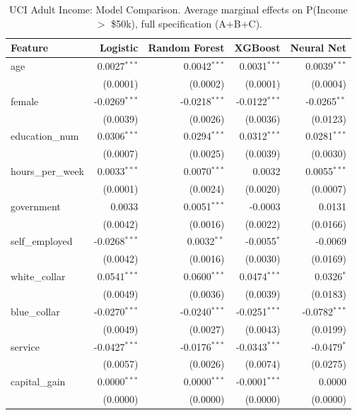 \documentclass[conference]{IEEEtran}
\begin{document}
	\begin{table}[htbp]
		\centering
		\small
		\begin{threeparttable}
			\caption{UCI Adult Income: Model Comparison. Average marginal effects on P(Income $>$ \$50k), full specification (A+B+C).}
			\label{tab:adult_model_comparison}
			\begin{tabular}{lrrrr}
				\toprule
				Feature & Logistic & Random Forest & XGBoost & Neural Net \\
				\midrule
				age & 0.0027$^{***}$ & 0.0042$^{***}$ & 0.0031$^{***}$ & 0.0039$^{***}$ \\
				& (0.0001) & (0.0002) & (0.0001) & (0.0004) \\
				female & -0.0269$^{***}$ & -0.0218$^{***}$ & -0.0122$^{***}$ & -0.0265$^{**}$ \\
				& (0.0039) & (0.0026) & (0.0036) & (0.0123) \\
				education\_num & 0.0306$^{***}$ & 0.0294$^{***}$ & 0.0312$^{***}$ & 0.0281$^{***}$ \\
				& (0.0007) & (0.0025) & (0.0039) & (0.0030) \\
				\midrule
				hours\_per\_week & 0.0033$^{***}$ & 0.0070$^{***}$ & 0.0032 & 0.0055$^{***}$ \\
				& (0.0001) & (0.0024) & (0.0020) & (0.0007) \\
				government & 0.0033 & 0.0051$^{***}$ & -0.0003 & 0.0131 \\
				& (0.0042) & (0.0016) & (0.0022) & (0.0166) \\
				self\_employed & -0.0268$^{***}$ & 0.0032$^{**}$ & -0.0055$^{*}$ & -0.0069 \\
				& (0.0042) & (0.0016) & (0.0030) & (0.0169) \\
				white\_collar & 0.0541$^{***}$ & 0.0600$^{***}$ & 0.0474$^{***}$ & 0.0326$^{*}$ \\
				& (0.0049) & (0.0036) & (0.0039) & (0.0183) \\
				blue\_collar & -0.0270$^{***}$ & -0.0240$^{***}$ & -0.0251$^{***}$ & -0.0782$^{***}$ \\
				& (0.0049) & (0.0027) & (0.0043) & (0.0199) \\
				service & -0.0427$^{***}$ & -0.0176$^{***}$ & -0.0343$^{***}$ & -0.0479$^{*}$ \\
				& (0.0057) & (0.0026) & (0.0074) & (0.0275) \\
				\midrule
				capital\_gain & 0.0000$^{***}$ & 0.0000$^{***}$ & -0.0001$^{***}$ & 0.0000 \\
				& (0.0000) & (0.0000) & (0.0000) & (0.0000) \\

\end{tabular}
\end{threeparttable}
\end{table}
\end{document}
